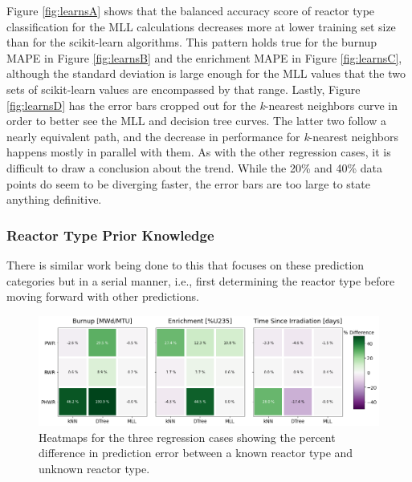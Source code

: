 Figure \ref{fig:learnsA} shows that the balanced accuracy score of reactor type
classification for the \gls{MLL} calculations decreases more at lower training
set size than for the scikit-learn algorithms.  This pattern holds true for the
burnup \gls{MAPE} in Figure \ref{fig:learnsB} and the enrichment \gls{MAPE} in
Figure \ref{fig:learnsC}, although the standard deviation is large enough for
the \gls{MLL} values that the two sets of scikit-learn values are encompassed
by that range. Lastly, Figure \ref{fig:learnsD} has the error bars cropped out
for the \textit{k}-nearest neighbors curve in order to better see the \gls{MLL}
and decision tree curves. The latter two follow a nearly equivalent path, and
the decrease in performance for \textit{k}-nearest neighbors happens mostly in
parallel with them. As with the other regression cases, it is difficult to draw
a conclusion about the trend. While the 20\% and 40\% data points do seem to be
diverging faster, the error bars are too large to state anything definitive.

\subsubsection{Reactor Type Prior Knowledge}

There is similar work being done  to this that focuses
on these prediction categories but in a serial manner, i.e., first determining
the reactor type before moving forward with other predictions.

\begin{figure}[!htb]
  \centering
  \includegraphics[width=\textwidth]{./chapters/exp1/rxtr-type_known-unknown_diff.png}
  \caption{Heatmaps for the three regression cases showing the percent 
           difference in prediction error between a known reactor type 
           and unknown reactor type.}
  \label{fig:knownrxtr}
\end{figure}

